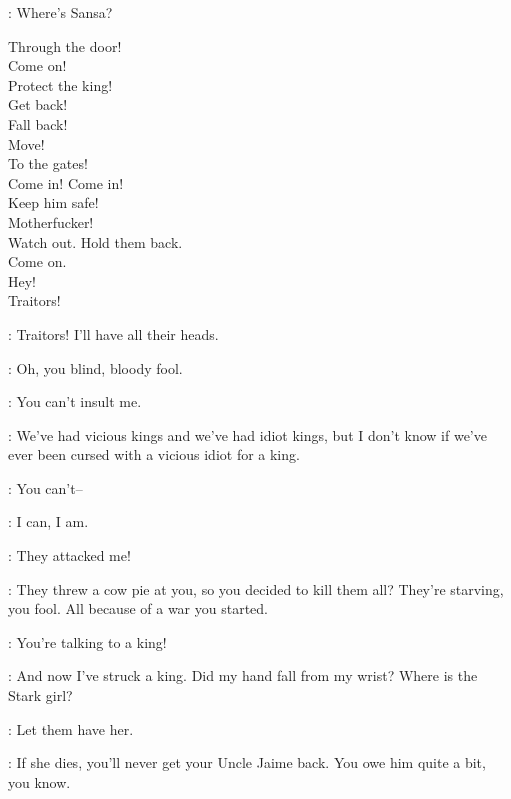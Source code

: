 
\TYRION: Where's Sansa? 


Through the door! \\
Come on! \\
Protect the king! \\
Get back! \\
Fall back! \\
Move! \\
To the gates! \\
Come in! Come in! \\
Keep him safe! \\
Motherfucker! \\
Watch out. Hold them back.\\ 
Come on. \\
Hey! \\
Traitors! 


\JOFFREY: Traitors! I'll have all their heads. 

\TYRION: Oh, you blind, bloody fool. 

\JOFFREY: You can't insult me. 

\TYRION: We've had vicious kings and we've had idiot kings, but I don't know if we've ever been cursed with a vicious idiot for a king. 

\JOFFREY: You can't-- 

\TYRION: I can, I am. 

\JOFFREY: They attacked me! 

\TYRION: They threw a cow pie at you, so you decided to kill them all? They're starving, you fool. All because of a war you started. 

\JOFFREY: You're talking to a king! 


\TYRION: And now I've struck a king. Did my hand fall from my wrist?  Where is the Stark girl? 

\JOFFREY: Let them have her. 

\TYRION: If she dies, you'll never get your Uncle Jaime back. You owe him quite a bit, you know. 

